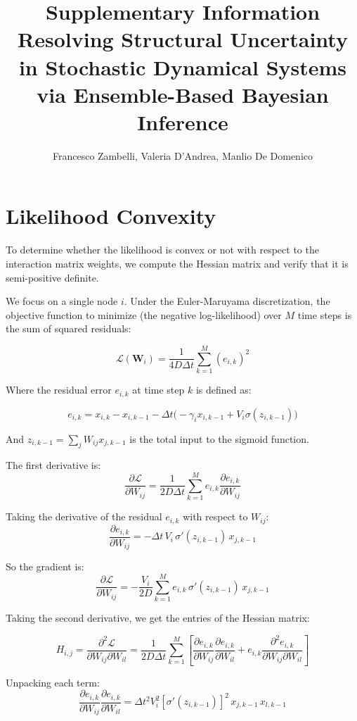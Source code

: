 \documentclass[11pt,onecolumn]{article}
\title{\textbf{Supplementary Information}\\[4pt]
\Large Resolving Structural Uncertainty in Stochastic Dynamical Systems via Ensemble-Based Bayesian Inference}
\author{Francesco Zambelli, Valeria D'Andrea, Manlio De Domenico}
\date{}
\theoremstyle{definition}
\theoremstyle{remark}
\begin{document}
\maketitle

\section{Likelihood Convexity}

To determine whether the likelihood is convex or not with respect to the interaction matrix weights, we compute the Hessian matrix and verify that it is semi-positive definite.

We focus on a single node $i$. Under the Euler-Maruyama discretization, the objective function to minimize (the negative log-likelihood) over $M$ time steps is the sum of squared residuals:

$$ \mathcal{L}(\mathbf{W}_i) = \frac{1}{4D \Delta t} \sum_{k=1}^M (e_{i,k})^2 $$

Where the residual error $e_{i,k}$ at time step $k$ is defined as:

$$ e_{i,k} = x_{i, k} - x_{i, k-1} - \Delta t \Big( -\gamma_i x_{i, k-1} + V_i \sigma(z_{i,k-1}) \Big) $$

And $z_{i,k-1} = \sum_{j} W_{ij} x_{j,k-1}$ is the total input to the sigmoid function.

The first derivative is:
$$ \frac{\partial \mathcal{L}}{\partial W_{ij}} = \frac{1}{2D \Delta t} \sum_{k=1}^M e_{i,k} \frac{\partial e_{i,k}}{\partial W_{ij}} $$

Taking the derivative of the residual $e_{i,k}$ with respect to $W_{ij}$:
$$ \frac{\partial e_{i,k}}{\partial W_{ij}} = - \Delta t \, V_i \, \sigma'(z_{i,k-1}) \, x_{j, k-1} $$

So the gradient is:
$$ \frac{\partial \mathcal{L}}{\partial W_{ij}} = - \frac{V_i}{2D} \sum_{k=1}^M e_{i,k} \, \sigma'(z_{i,k-1}) \, x_{j, k-1} $$

Taking the second derivative, we get the entries of the Hessian matrix:

$$ H_{i,j} = \frac{\partial^2 \mathcal{L}}{\partial W_{ij} \partial W_{il}} = \frac{1}{2D \Delta t} \sum_{k=1}^M \left[ \frac{\partial e_{i,k}}{\partial W_{ij}} \frac{\partial e_{i,k}}{\partial W_{il}} + e_{i,k} \frac{\partial^2 e_{i,k}}{\partial W_{ij} \partial W_{il}} \right] $$

Unpacking each term:
    $$ \frac{\partial e_{i,k}}{\partial W_{ij}} \frac{\partial e_{i,k}}{\partial W_{il}} = \Delta t^2 V_i^2 [\sigma'(z_{i,k-1})]^2 \, x_{j, k-1} \, x_{l, k-1} $$
    
\end{document}
